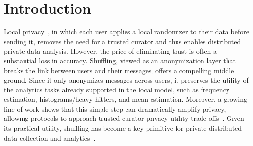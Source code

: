 \documentclass{article}
\theoremstyle{plain}
\theoremstyle{definition}
\begin{document}



\section{Introduction}

Local privacy~\cite{duchiLocalPrivacyStatistical2013}, in which each user applies a local randomizer to their data before sending it, removes the need for a trusted curator and thus enables distributed private data analysis.
However, the price of eliminating trust is often a substantial loss in accuracy.
Shuffling, viewed as an anonymization layer that breaks the link between users and their messages, offers a compelling middle ground.
Since it only anonymizes messages across users, it preserves the utility of the analytics tasks already supported in the local model, such as frequency estimation, histograms/heavy hitters, and mean estimation.
Moreover, a growing line of work shows that this simple step can dramatically amplify privacy, allowing protocols to approach trusted-curator privacy-utility trade-offs~\cite{feldmanHidingClonesSimple2022,ballePrivacyBlanketShuffle2019, erlingssonAmplificationShufflingLocal2019}.
Given its practical utility, shuffling has become a key primitive for private distributed data collection and analytics~\cite{liewNetworkShufflingPrivacy2022,luoRM2AnswerCounting2025}.
\end{document}
